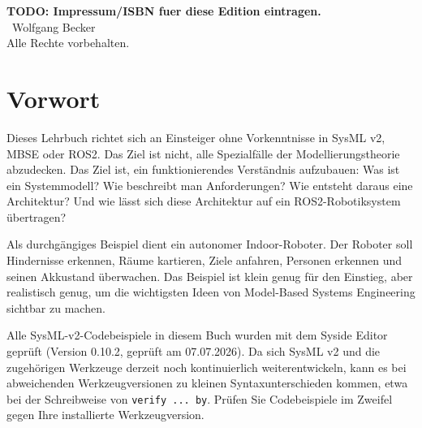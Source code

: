 %

\providecommand{\editionimpressum}{%
    \textbf{TODO: Impressum/ISBN fuer diese Edition eintragen.}\\[1em]
    \textcopyright\ Wolfgang Becker\\
    Alle Rechte vorbehalten.
}

\frontmatter
\maketitle

\cleardoublepage
\thispagestyle{empty}
\vspace*{\fill}
\noindent
\editionimpressum
\vspace*{\fill}
\clearpage

\tableofcontents

\chapter*{Vorwort}
Dieses Lehrbuch richtet sich an Einsteiger ohne Vorkenntnisse in SysML v2, MBSE oder ROS2.
Das Ziel ist nicht, alle Spezialfälle der Modellierungstheorie abzudecken. Das Ziel ist, ein funktionierendes Verständnis aufzubauen:
Was ist ein Systemmodell? Wie beschreibt man Anforderungen? Wie entsteht daraus eine Architektur? Und wie lässt sich diese Architektur auf ein ROS2-Robotiksystem übertragen?

Als durchgängiges Beispiel dient ein autonomer Indoor-Roboter. Der Roboter soll Hindernisse erkennen, Räume kartieren, Ziele anfahren, Personen erkennen und seinen Akkustand überwachen.
Das Beispiel ist klein genug für den Einstieg, aber realistisch genug, um die wichtigsten Ideen von Model-Based Systems Engineering sichtbar zu machen.

Alle SysML-v2-Codebeispiele in diesem Buch wurden mit dem Syside Editor geprüft (Version 0.10.2, geprüft am 07.07.2026). Da sich SysML v2 und die zugehörigen Werkzeuge derzeit noch kontinuierlich weiterentwickeln, kann es bei abweichenden Werkzeugversionen zu kleinen Syntaxunterschieden kommen, etwa bei der Schreibweise von \texttt{verify ... by}. Prüfen Sie Codebeispiele im Zweifel gegen Ihre installierte Werkzeugversion.

